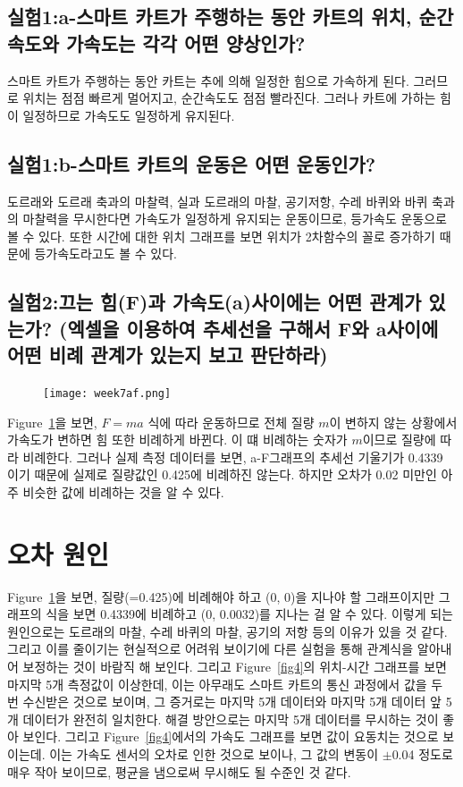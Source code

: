\documentclass[12pt,a4paper]{article}
\begin{document}
\subsection{실험1:a-스마트 카트가 주행하는 동안 카트의 위치, 순간속도와 가속도는 각각
    어떤 양상인가?}
스마트 카트가 주행하는 동안 카트는 추에 의해 일정한 힘으로 가속하게 된다. 그러므로
위치는 점점 빠르게 멀어지고, 순간속도도 점점 빨라진다. 그러나 카트에 가하는 힘이
일정하므로 가속도도 일정하게 유지된다.
\subsection{실험1:b-스마트 카트의 운동은 어떤 운동인가?}
도르래와 도르래 축과의 마찰력, 실과 도르래의 마찰, 공기저항, 수레 바퀴와 바퀴 축과의
마찰력을 무시한다면 가속도가 일정하게 유지되는 운동이므로, 등가속도 운동으로 볼 수
있다. 또한 시간에 대한 위치 그래프를 보면 위치가 2차함수의 꼴로 증가하기 때문에
등가속도라고도 볼 수 있다.
\subsection{실험2:끄는 힘(F)과 가속도(a)사이에는 어떤 관계가 있는가? (엑셀을 이용하여
    추세선을 구해서 F와 a사이에 어떤 비례 관계가 있는지 보고 판단하라)}
\begin{figure}
    \centering
    \texttt{[image: week7af.png]}
    \caption{\label{fig7}}
\end{figure}
Figure~\ref{fig7}을 보면, $F=ma$ 식에 따라 운동하므로 전체 질량 $m$이 변하지 않는
상황에서 가속도가 변하면 힘 또한 비례하게 바뀐다. 이 떄 비례하는 숫자가 $m$이므로
질량에 따라 비례한다. 그러나 실제 측정 데이터를 보면, a-F그래프의 추세선 기울기가
0.4339 이기 때문에 실제로 질량값인 0.425에 비례하진 않는다. 하지만 오차가 0.02 미만인
아주 비슷한 값에 비례하는 것을 알 수 있다.
\section{오차 원인}
Figure~\ref{fig7}을 보면, 질량(=0.425)에 비례해야 하고 (0, 0)을 지나야 할
그래프이지만 그래프의 식을 보면 0.4339에 비례하고 (0, 0.0032)를 지나는 걸 알 수 있다.
이렇게 되는 원인으로는 도르래의 마찰, 수레 바퀴의 마찰, 공기의 저항 등의 이유가 있을
것 같다. 그리고 이를 줄이기는 현실적으로 어려워 보이기에 다른 실험을 통해 관계식을
알아내어 보정하는 것이 바람직 해 보인다. 그리고 Figure~\ref{fig4}의 위치-시간
그래프를 보면 마지막 5개 측정값이 이상한데, 이는 아무래도 스마트 카트의 통신 과정에서
값을 두 번 수신받은 것으로 보이며, 그 증거로는 마지막 5개 데이터와 마지막 5개 데이터
앞 5개 데이터가 완전히 일치한다. 해결 방안으로는 마지막 5개 데이터를 무시하는 것이
좋아 보인다. 그리고 Figure~\ref{fig4}에서의 가속도 그래프를 보면 값이 요동치는 것으로
보이는데. 이는 가속도 센서의 오차로 인한 것으로 보이나, 그 값의 변동이 $\pm$0.04
정도로 매우 작아 보이므로, 평균을 냄으로써 무시해도 될 수준인 것 같다.
\end{document}
